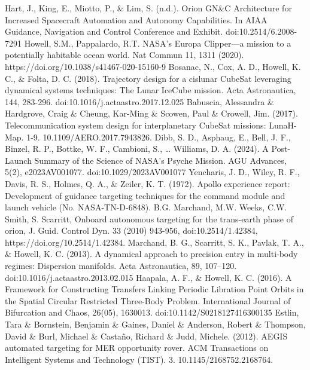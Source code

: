 \documentclass[conference]{IEEEtran}
\begin{document}


\begin{thebibliography}{00}

 Hart, J., King, E., Miotto, P., \& Lim, S. (n.d.). Orion GN\&C Architecture for Increased Spacecraft Automation and Autonomy Capabilities. In AIAA Guidance, Navigation and Control Conference and Exhibit. doi:10.2514/6.2008-7291
 Howell, S.M., Pappalardo, R.T. NASA's Europa Clipper—a mission to a potentially habitable ocean world. Nat Commun 11, 1311 (2020). https://doi.org/10.1038/s41467-020-15160-9
 Bosanac, N., Cox, A. D., Howell, K. C., \& Folta, D. C. (2018). Trajectory design for a cislunar CubeSat leveraging dynamical systems techniques: The Lunar IceCube mission. Acta Astronautica, 144, 283-296. doi:10.1016/j.actaastro.2017.12.025
 Babuscia, Alessandra \& Hardgrove, Craig \& Cheung, Kar-Ming \& Scowen, Paul \& Crowell, Jim. (2017). Telecommunication system design for interplanetary CubeSat missions: LunaH-Map. 1-9. 10.1109/AERO.2017.7943826.
 Dibb, S. D., Asphaug, E., Bell, J. F., Binzel, R. P., Bottke, W. F., Cambioni, S., … Williams, D. A. (2024). A Post-Launch Summary of the Science of NASA's Psyche Mission. AGU Advances, 5(2), e2023AV001077. doi:10.1029/2023AV001077
 Yencharis, J. D., Wiley, R. F., Davis, R. S., Holmes, Q. A., \& Zeiler, K. T. (1972). Apollo experience report: Development of guidance targeting techniques for the command module and launch vehicle (No. NASA-TN-D-6848).
 B.G. Marchand, M.W. Weeks, C.W. Smith, S. Scarritt, Onboard autonomous targeting for the trans-earth phase of orion, J. Guid. Control Dyn. 33 (2010) 943-956, doi:10.2514/1.42384, https://doi.org/10.2514/1.42384.
 Marchand, B. G., Scarritt, S. K., Pavlak, T. A., \& Howell, K. C. (2013). A dynamical approach to precision entry in multi-body regimes: Dispersion manifolds. Acta Astronautica, 89, 107–120. doi:10.1016/j.actaastro.2013.02.015
 Haapala, A. F., \& Howell, K. C. (2016). A Framework for Constructing Transfers Linking Periodic Libration Point Orbits in the Spatial Circular Restricted Three-Body Problem. International Journal of Bifurcation and Chaos, 26(05), 1630013. doi:10.1142/S0218127416300135
 Estlin, Tara \& Bornstein, Benjamin \& Gaines, Daniel \& Anderson, Robert \& Thompson, David \& Burl, Michael \& Castaño, Richard \& Judd, Michele. (2012). AEGIS automated targeting for MER opportunity rover. ACM Transactions on Intelligent Systems and Technology (TIST). 3. 10.1145/2168752.2168764.

\end{thebibliography}
\end{document}
